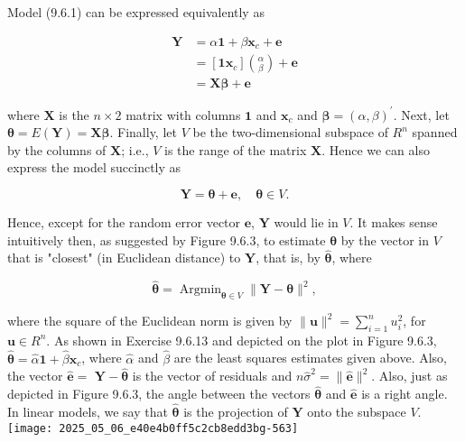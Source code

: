 Model (9.6.1) can be expressed equivalently as


\begin{align*}
\mathbf{Y} & =\alpha \mathbf{1}+\beta \mathbf{x}_{c}+\mathbf{e} \\
& =\left[\mathbf{1} \mathbf{x}_{c}\right]\binom{\alpha}{\beta}+\mathbf{e} \\
& =\mathbf{X} \boldsymbol{\beta}+\mathbf{e} \tag{9.6.13}
\end{align*}


where $\mathbf{X}$ is the $n \times 2$ matrix with columns $\mathbf{1}$ and $\mathbf{x}_{c}$ and $\boldsymbol{\beta}=(\alpha, \beta)^{\prime}$. Next, let $\boldsymbol{\theta}=E(\mathbf{Y})=\mathbf{X} \boldsymbol{\beta}$. Finally, let $V$ be the two-dimensional subspace of $R^{n}$ spanned by the columns of $\mathbf{X}$; i.e., $V$ is the range of the matrix $\mathbf{X}$. Hence we can also express the model succinctly as


\begin{equation*}
\mathbf{Y}=\boldsymbol{\theta}+\mathbf{e}, \quad \boldsymbol{\theta} \in V . \tag{9.6.14}
\end{equation*}


Hence, except for the random error vector $\mathbf{e}$, $\mathbf{Y}$ would lie in $V$. It makes sense intuitively then, as suggested by Figure 9.6.3, to estimate $\boldsymbol{\theta}$ by the vector in $V$ that is "closest" (in Euclidean distance) to $\mathbf{Y}$, that is, by $\hat{\boldsymbol{\theta}}$, where


\begin{equation*}
\hat{\boldsymbol{\theta}}=\operatorname{Argmin}_{\boldsymbol{\theta} \in V}\|\mathbf{Y}-\boldsymbol{\theta}\|^{2}, \tag{9.6.15}
\end{equation*}


where the square of the Euclidean norm is given by $\|\mathbf{u}\|^{2}=\sum_{i=1}^{n} u_{i}^{2}$, for $\mathbf{u} \in R^{n}$. As shown in Exercise 9.6.13 and depicted on the plot in Figure 9.6.3, $\hat{\boldsymbol{\theta}}=\hat{\alpha} \mathbf{1}+\hat{\beta} \mathbf{x}_{c}$, where $\hat{\alpha}$ and $\hat{\beta}$ are the least squares estimates given above. Also, the vector $\hat{\mathbf{e}}=$ $\mathbf{Y}-\hat{\boldsymbol{\theta}}$ is the vector of residuals and $n \hat{\sigma}^{2}=\|\hat{\mathbf{e}}\|^{2}$. Also, just as depicted in Figure 9.6.3, the angle between the vectors $\hat{\boldsymbol{\theta}}$ and $\hat{\mathbf{e}}$ is a right angle. In linear models, we say that $\hat{\boldsymbol{\theta}}$ is the projection of $\mathbf{Y}$ onto the subspace $V$.\\
\texttt{[image: 2025\_05\_06\_e40e4b0ff5c2cb8edd3bg-563]}

